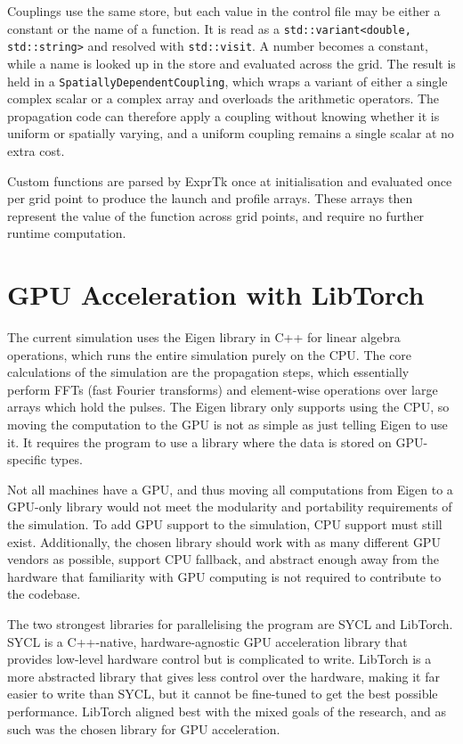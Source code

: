 Couplings use the same store, but each value in the control file may be either a constant or the name of a function. 
It is read as a \texttt{std::variant<double, std::string>} and resolved with \texttt{std::visit}. A number becomes a 
constant, while a name is looked up in the store and evaluated across the grid. The result is held in a 
\texttt{SpatiallyDependentCoupling}, which wraps a variant of either a single complex scalar or a complex array 
and overloads the arithmetic operators. The propagation code can therefore apply a coupling without knowing whether 
it is uniform or spatially varying, and a uniform coupling remains a single scalar at no extra cost.

Custom functions are parsed by ExprTk once at initialisation and evaluated once per grid point to produce the 
launch and profile arrays. These arrays then represent the value of the function across grid points, and require
no further runtime computation.

\section{GPU Acceleration with LibTorch}

The current simulation uses the Eigen library in C++ for linear algebra operations, which runs the entire simulation purely 
on the CPU. The core calculations of the simulation are the propagation steps, which essentially perform FFTs (fast Fourier transforms) and element-wise 
operations over large arrays which hold the pulses. The Eigen library only supports using the CPU, so moving the computation
to the GPU is not as simple as just telling Eigen to use it. It requires the program to use a library where the data is stored
on GPU-specific types. 

Not all machines have a GPU, and thus moving all computations from Eigen to a GPU-only library would not meet the modularity 
and portability requirements of the simulation. To add GPU support to the simulation, CPU support must still exist. 
Additionally, the chosen library should work with as many different GPU vendors as possible, support CPU fallback, and 
abstract enough away from the hardware that familiarity with GPU computing is not required to contribute to the codebase.

The two strongest libraries for parallelising the program are SYCL and LibTorch. SYCL is a C++-native, hardware-agnostic 
GPU acceleration library that provides low-level hardware control but is complicated to write. LibTorch is a more abstracted 
library that gives less control over the hardware, making it far easier to write than SYCL, but it cannot be fine-tuned to
get the best possible performance. LibTorch aligned best with the mixed goals of the research, and as such was the chosen 
library for GPU acceleration.

